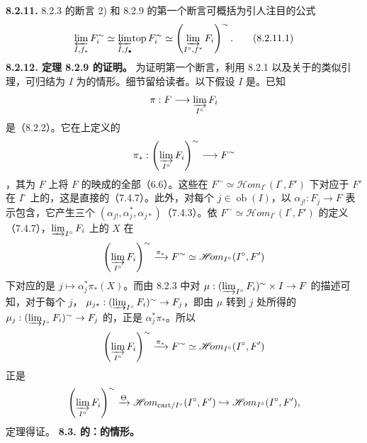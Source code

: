 \textbf{8.2.11.} 8.2.3 的断言 2) 和 8.2.9 的第一个断言可概括为引人注目的公式
\[\varprojlim_{I,f_*}F_i^\sim\simeq\varprojlim_{I,f_\bullet}\!\operatorname{top}F_i^\sim\simeq\left(\varinjlim_{I^\circ,f^*}F_i\right)^\sim.\tag{8.2.11.1}\]
\textbf{8.2.12. 定理 8.2.9 的证明。} 为证明第一个断言，利用 8.2.1 以及关于的类似引理，可归结为 $I$ 为的情形。细节留给读者。以下假设 $I$ 是。已知
\[\pi:F\longrightarrow\varinjlim_{I^\circ}F_i\]
是（8.2.2）。它在上定义的
\[\pi_*:\left(\varinjlim_{I^\circ}F_i\right)^\sim\longrightarrow F^\sim\]
，其为 $F$ 上将 $F$ 的映成的全部（6.6）。这些在 $F^\sim\simeq\mathscr{H}\!om_{I^\circ}(I^\circ,F')$ 下对应于 $F'$ 在 $I^\circ$ 上的，这是直接的（7.4.7）。此外，对每个 $j\in\operatorname{ob}(I)$，以 $\alpha_{j!}:F_j\to F$ 表示包含，它产生三个 $(\alpha_{j!},\alpha_j^*,\alpha_{j*})$（7.4.3）。依 $F^\sim\simeq\mathscr{H}\!om_{I^\circ}(I^\circ,F')$ 的定义（7.4.7），$\varinjlim_{I^\circ}F_i$ 上的 $X$ 在
\[\left(\varinjlim_{I^\circ}F_i\right)^\sim\xrightarrow{\pi_*}F^\sim\simeq\mathscr{H}\!om_{I^\circ}(I^\circ,F')\]
下对应的是 $j\mapsto\alpha_j^*\pi_*(X)$。而由 8.2.3 中对 $\mu:(\varinjlim_{I^\circ}F_i)^\sim\times I\to F$ 的描述可知，对于每个 $j$， $\mu_{j*}:(\varinjlim_{I^\circ}F_i)^\sim\to F_j$，即由 $\mu$ 转到 $j$ 处所得的 $\mu_j:(\varinjlim_{I^\circ}F_i)^\sim\to F_j$ 的，正是 $\alpha_j^*\pi_*$。所以
\[\left(\varinjlim_{I^\circ}F_i\right)^\sim\xrightarrow{\pi_*}F^\sim\simeq\mathscr{H}\!om_{I^\circ}(I^\circ,F')\]
正是
\[\left(\varinjlim_{I^\circ}F_i\right)^\sim\xrightarrow\Theta\mathscr{H}\!om_{\mathrm{cart}/I^\circ}(I^\circ,F')\hookrightarrow\mathscr{H}\!om_{I^\circ}(I^\circ,F'),\]
定理得证。
\textbf{8.3. 的：的情形。}

